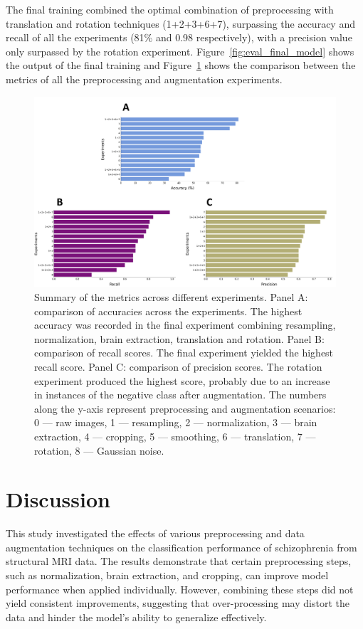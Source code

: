 The final training combined the optimal combination of preprocessing with translation and rotation techniques (1+2+3+6+7), surpassing the accuracy and recall of all the experiments (81\% and 0.98 respectively), with a precision value only surpassed by the rotation experiment. Figure~\ref{fig:eval_final_model} shows the output of the final training and Figure~\ref{fig:model_metrics_comparison} shows the comparison between the metrics of all the preprocessing and augmentation experiments.
\begin{figure}
    \centering
    \includegraphics[width=1.0\textwidth]{./figs/model_metrics_comparison.png} %
    \caption{Summary of the metrics across different experiments. Panel A: comparison of accuracies across the experiments. The highest accuracy was recorded in the final experiment combining resampling, normalization, brain extraction, translation and rotation. Panel B: comparison of recall scores. The final experiment yielded the highest recall score. Panel C: comparison of precision scores. The rotation experiment produced the highest score, probably due to an increase in instances of the negative class after augmentation. The numbers along the y-axis represent preprocessing and augmentation scenarios: 0 --- raw images, 1 --- resampling, 2 --- normalization, 3 --- brain extraction, 4 --- cropping, 5 --- smoothing, 6 --- translation, 7 --- rotation, 8 --- Gaussian noise.}\label{fig:model_metrics_comparison}
\end{figure}

\section{Discussion}

This study investigated the effects of various preprocessing and data augmentation techniques on the classification performance of schizophrenia from structural MRI data. The results demonstrate that certain preprocessing steps, such as normalization, brain extraction, and cropping, can improve model performance when applied individually. However, combining these steps did not yield consistent improvements, suggesting that over-processing may distort the data and hinder the model's ability to generalize effectively.


